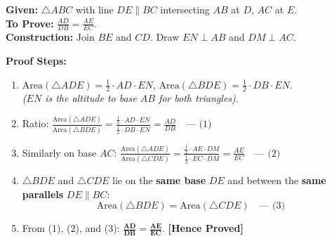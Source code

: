 \documentclass[10pt,a4paper]{article}
\begin{document}
\begin{minipage}[t]{0.56\textwidth}
  \textbf{Given:} $\triangle ABC$ with line $DE \parallel BC$ intersecting $AB$ at $D$, $AC$ at $E$.\\
  \textbf{To Prove:} $\frac{AD}{DB} = \frac{AE}{EC}$.\\
  \textbf{Construction:} Join $BE$ and $CD$. Draw $EN \perp AB$ and $DM \perp AC$.

  \vspace{0.8mm}
  \textbf{Proof Steps:}
  \begin{enumerate}[leftmargin=4mm, itemsep=1pt]
    \item $\text{Area}(\triangle ADE) = \frac{1}{2} \cdot AD \cdot EN$, \quad $\text{Area}(\triangle BDE) = \frac{1}{2} \cdot DB \cdot EN$. \\
      \textit{($EN$ is the altitude to base $AB$ for both triangles)}.
    \item Ratio:
      $\frac{\text{Area}(\triangle ADE)}{\text{Area}(\triangle BDE)} = \frac{\frac{1}{2} \cdot AD \cdot EN}{\frac{1}{2} \cdot DB \cdot EN} = \frac{AD}{DB} \quad \text{--- (1)}$
    \item Similarly on base $AC$:
      $\frac{\text{Area}(\triangle ADE)}{\text{Area}(\triangle CDE)} = \frac{\frac{1}{2} \cdot AE \cdot DM}{\frac{1}{2} \cdot EC \cdot DM} = \frac{AE}{EC} \quad \text{--- (2)}$
    \item $\triangle BDE$ and $\triangle CDE$ lie on the \textbf{same base} $DE$ and between the \textbf{same parallels} $DE \parallel BC$:
      \[
        \text{Area}(\triangle BDE) = \text{Area}(\triangle CDE) \quad \text{--- (3)}
      \]
    \item From (1), (2), and (3):
      $\mathbf{\frac{AD}{DB} = \frac{AE}{EC}}$. \quad \textbf{[Hence Proved]}
  \end{enumerate}
\end{minipage}\hfill
\end{document}
